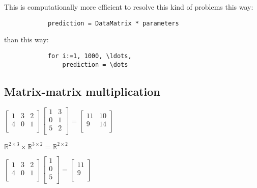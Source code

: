 \documentclass[a4paper]{report}
\begin{document}
          This is computationally more efficient to resolve this kind of
          problems this way:

          \begin{lstlisting}
            prediction = DataMatrix * parameters
          \end{lstlisting}

          than this way:

          \begin{lstlisting}
            for i:=1, 1000, \ldots,
                prediction = \dots
          \end{lstlisting}

      \subsection{Matrix-matrix multiplication}

        $\begin{bmatrix}
          1 & 3 & 2 \\
          4 & 0 & 1 \\
        \end{bmatrix}
        \begin{bmatrix}
          1 & 3 \\
          0 & 1 \\
          5 & 2 \\
        \end{bmatrix}
        =
        \begin{bmatrix}
            11 & 10 \\
            9 & 14 \\
        \end{bmatrix}$

        $\mathbb{R}^{2 \times 3} \times \mathbb{R}^{3 \times 2} = \mathbb{R}^{2 \times 2}$

        $\begin{bmatrix}
          1 & 3 & 2 \\
          4 & 0 & 1 \\
        \end{bmatrix}
        \begin{bmatrix}
          1 \\
          0 \\
          5 \\
        \end{bmatrix}
        =
        \begin{bmatrix}
          11 \\
          9 \\
        \end{bmatrix}$
\end{document}
